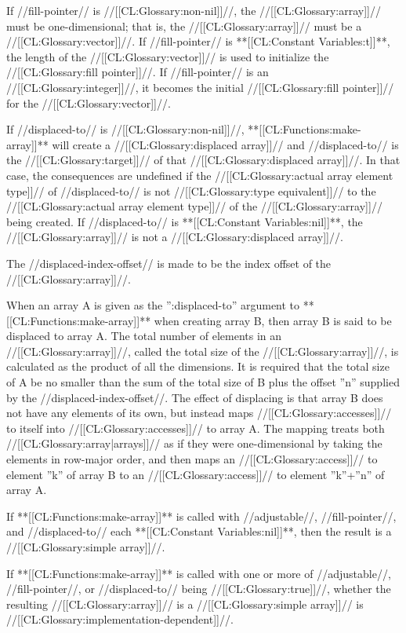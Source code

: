 If //fill-pointer// is //[[CL:Glossary:non-nil]]//, the //[[CL:Glossary:array]]// must be one-dimensional; that is, the //[[CL:Glossary:array]]// must be a //[[CL:Glossary:vector]]//. If //fill-pointer// is **[[CL:Constant Variables:t]]**, the length of the //[[CL:Glossary:vector]]// is used to initialize the //[[CL:Glossary:fill pointer]]//. If //fill-pointer// is an //[[CL:Glossary:integer]]//, it becomes the initial //[[CL:Glossary:fill pointer]]// for the //[[CL:Glossary:vector]]//.

If //displaced-to// is //[[CL:Glossary:non-nil]]//, **[[CL:Functions:make-array]]** will create a //[[CL:Glossary:displaced array]]// and //displaced-to// is the //[[CL:Glossary:target]]// of that //[[CL:Glossary:displaced array]]//. In that case, the consequences are undefined if the //[[CL:Glossary:actual array element type]]// of //displaced-to// is not //[[CL:Glossary:type equivalent]]// to the //[[CL:Glossary:actual array element type]]// of the //[[CL:Glossary:array]]// being created. If //displaced-to// is **[[CL:Constant Variables:nil]]**, the //[[CL:Glossary:array]]// is not a //[[CL:Glossary:displaced array]]//.

The //displaced-index-offset// is made to be the index offset of the //[[CL:Glossary:array]]//.

When an array A is given as the '':displaced-to'' argument to **[[CL:Functions:make-array]]** when creating array B, then array B is said to be displaced to array A. The total number of elements in an //[[CL:Glossary:array]]//, called the total size of the //[[CL:Glossary:array]]//, is calculated as the product of all the dimensions. It is required that the total size of A be no smaller than the sum of the total size of B plus the offset ''n'' supplied by the //displaced-index-offset//. The effect of displacing is that array B does not have any elements of its own, but instead maps //[[CL:Glossary:accesses]]// to itself into //[[CL:Glossary:accesses]]// to array A. The mapping treats both //[[CL:Glossary:array|arrays]]// as if they were one-dimensional by taking the elements in row-major order, and then maps an //[[CL:Glossary:access]]// to element ''k'' of array B to an //[[CL:Glossary:access]]// to element ''k''+''n'' of array A.

If **[[CL:Functions:make-array]]** is called with //adjustable//, //fill-pointer//, and //displaced-to// each **[[CL:Constant Variables:nil]]**, then the result is a //[[CL:Glossary:simple array]]//.

If **[[CL:Functions:make-array]]** is called with one or more of //adjustable//, //fill-pointer//, or //displaced-to// being //[[CL:Glossary:true]]//, whether the resulting //[[CL:Glossary:array]]// is a //[[CL:Glossary:simple array]]// is //[[CL:Glossary:implementation-dependent]]//.


